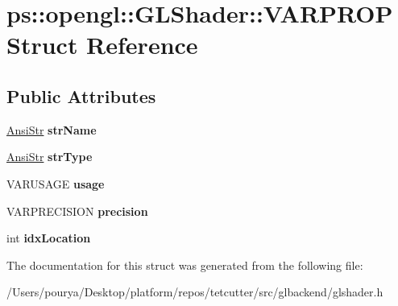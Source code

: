 \hypertarget{structps_1_1opengl_1_1GLShader_1_1VARPROP}{}\section{ps\+:\+:opengl\+:\+:G\+L\+Shader\+:\+:V\+A\+R\+P\+R\+O\+P Struct Reference}
\label{structps_1_1opengl_1_1GLShader_1_1VARPROP}
\subsection*{Public Attributes}
\begin{DoxyCompactItemize}
\item 
\hypertarget{structps_1_1opengl_1_1GLShader_1_1VARPROP_aaae917d30bc1da64325ab09c55dedc74}{}\hyperlink{classps_1_1base_1_1CAString}{Ansi\+Str} {\bfseries str\+Name}\label{structps_1_1opengl_1_1GLShader_1_1VARPROP_aaae917d30bc1da64325ab09c55dedc74}

\item 
\hypertarget{structps_1_1opengl_1_1GLShader_1_1VARPROP_a4f9919cb26bf4b102aac16349bd54bdf}{}\hyperlink{classps_1_1base_1_1CAString}{Ansi\+Str} {\bfseries str\+Type}\label{structps_1_1opengl_1_1GLShader_1_1VARPROP_a4f9919cb26bf4b102aac16349bd54bdf}

\item 
\hypertarget{structps_1_1opengl_1_1GLShader_1_1VARPROP_ae26a88b405fc5ddd66eb1324b5b75aa5}{}V\+A\+R\+U\+S\+A\+G\+E {\bfseries usage}\label{structps_1_1opengl_1_1GLShader_1_1VARPROP_ae26a88b405fc5ddd66eb1324b5b75aa5}

\item 
\hypertarget{structps_1_1opengl_1_1GLShader_1_1VARPROP_a5c1e1e1689b3db0c57c766beaab05c4a}{}V\+A\+R\+P\+R\+E\+C\+I\+S\+I\+O\+N {\bfseries precision}\label{structps_1_1opengl_1_1GLShader_1_1VARPROP_a5c1e1e1689b3db0c57c766beaab05c4a}

\item 
\hypertarget{structps_1_1opengl_1_1GLShader_1_1VARPROP_a418991e949e8c8076723a496c0c19ace}{}int {\bfseries idx\+Location}\label{structps_1_1opengl_1_1GLShader_1_1VARPROP_a418991e949e8c8076723a496c0c19ace}

\end{DoxyCompactItemize}


The documentation for this struct was generated from the following file\+:\begin{DoxyCompactItemize}
\item 
/\+Users/pourya/\+Desktop/platform/repos/tetcutter/src/glbackend/glshader.\+h\end{DoxyCompactItemize}
